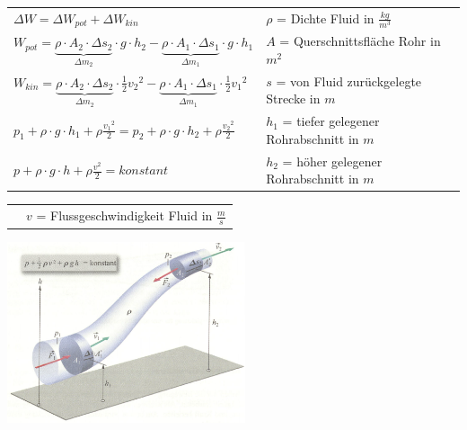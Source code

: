 		\begin{minipage}{12.5cm}
				\renewcommand{\arraystretch}{2.5}
				\begin{tabular}{ p{7.3cm} | p{4.5cm}}
					$\Delta W = \Delta W_{pot} + \Delta W_{kin}$	&	$\rho$ = Dichte Fluid in $\frac{kg}{m^3}$\\
					$W_{pot} = \underbrace{\rho \cdot A_2 \cdot \Delta s_2}_{\Delta m_2} \cdot g \cdot h_2 - \underbrace{\rho \cdot A_1 \cdot \Delta s_1}_{\Delta m_1} \cdot g \cdot h_1$	&	$A$ = Querschnittsfläche Rohr in $m^2$\\
					$W_{kin} = \underbrace{\rho \cdot A_2 \cdot \Delta s_2}_{\Delta m_2} \cdot \frac{1}{2} {v_2}^2 - \underbrace{\rho \cdot A_1 \cdot \Delta s_1}_{\Delta m_1} \cdot \frac{1}{2} {v_1}^2$	&	$s$ = von Fluid zurückgelegte Strecke in $m$\\
					$p_1 + \rho \cdot g \cdot h_1 + \rho \frac{{v_1}^2}{2} = p_2 + \rho \cdot g \cdot h_2 + \rho \frac{{v_2}^2}{2}$	&	$h_1$ = tiefer gelegener Rohrabschnitt in $m$\\
					$p + \rho \cdot g \cdot h + \rho \frac{{v}^2}{2} = konstant$	&	$h_2$ = höher gelegener Rohrabschnitt in $m$\\
				\end{tabular}
				\renewcommand{\arraystretch}{1.5}
				\begin{tabular}{ p{7.3cm} | p{7cm} }
					& $v$ = Flussgeschwindigkeit Fluid in $\frac{m}{s}$\\
				\end{tabular} 
				\renewcommand{\arraystretch}{1}
		\end{minipage}
		\begin{minipage}{10cm}
			\vspace{-\ht\strutbox}\includegraphics[width=7cm]{./bilder/BernoulliGleichung.png}
		\end{minipage}
		\newline
		\newline
		
